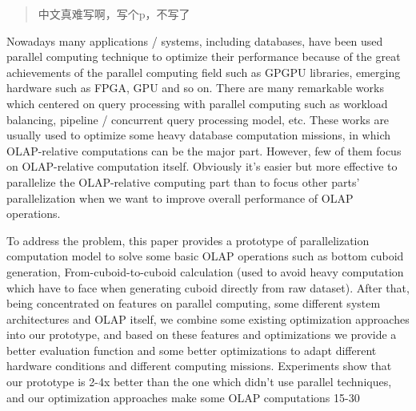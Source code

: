 ﻿\begin{abstract}
中文真难写啊，写个p，不写了

\end{abstract}

\begin{enabstract}
Nowadays many applications / systems, including databases, have been used parallel computing technique to optimize their performance because of the great achievements of the parallel computing field such as GPGPU libraries, emerging hardware such as FPGA, GPU and so on. There are many remarkable works which centered on query processing with parallel computing such as workload balancing, pipeline / concurrent query processing model, etc. These works are usually used to optimize some heavy database computation missions, in which OLAP-relative computations can be the major part. However, few of them focus on OLAP-relative computation itself. Obviously it's easier but more effective to parallelize the OLAP-relative computing part than to focus other parts' parallelization when we want to improve overall performance of OLAP operations.

To address the problem, this paper provides a prototype of parallelization computation model to solve some basic OLAP operations such as bottom cuboid generation, From-cuboid-to-cuboid calculation (used to avoid heavy computation which have to face when generating cuboid directly from raw dataset). After that, being concentrated on features on parallel computing, some different system architectures and OLAP itself, we combine some existing optimization approaches into our prototype, and based on these features and optimizations we provide a better evaluation function and some better optimizations to adapt different hardware conditions and different computing missions. Experiments show that our prototype is 2-4x better than the one which didn't use parallel techniques, and our optimization approaches make some OLAP computations 15-30%


\end{enabstract}
